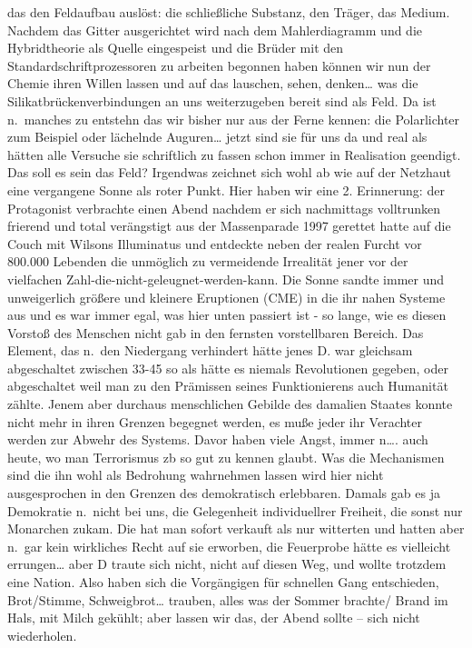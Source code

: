 \documentclass[
]{article}
\begin{document}
das den Feldaufbau auslöst: die schließliche Substanz, den Träger, das
Medium. Nachdem das Gitter ausgerichtet wird nach dem Mahlerdiagramm und
die Hybridtheorie als Quelle eingespeist und die Brüder mit den
Standardschriftprozessoren zu arbeiten begonnen haben können wir nun der
Chemie ihren Willen lassen und auf das lauschen, sehen, denken\ldots{}
was die Silikatbrückenverbindungen an uns weiterzugeben bereit sind als
Feld. Da ist n.~manches zu entstehn das wir bisher nur aus der Ferne
kennen: die Polarlichter zum Beispiel oder lächelnde Auguren\ldots{}
jetzt sind sie für uns da und real als hätten alle Versuche sie
schriftlich zu fassen schon immer in Realisation geendigt. Das soll es
sein das Feld? Irgendwas zeichnet sich wohl ab wie auf der Netzhaut eine
vergangene Sonne als roter Punkt. Hier haben wir eine 2. Erinnerung: der
Protagonist verbrachte einen Abend nachdem er sich nachmittags
volltrunken frierend und total verängstigt aus der Massenparade 1997
gerettet hatte auf die Couch mit Wilsons Illuminatus und entdeckte neben
der realen Furcht vor 800.000 Lebenden die unmöglich zu vermeidende
Irrealität jener vor der vielfachen
Zahl-die-nicht-geleugnet-werden-kann. Die Sonne sandte immer und
unweigerlich größere und kleinere Eruptionen (CME) in die ihr nahen
Systeme aus und es war immer egal, was hier unten passiert ist - so
lange, wie es diesen Vorstoß des Menschen nicht gab in den fernsten
vorstellbaren Bereich. Das Element, das n.~den Niedergang verhindert
hätte jenes D. war gleichsam abgeschaltet zwischen 33-45 so als hätte es
niemals Revolutionen gegeben, oder abgeschaltet weil man zu den
Prämissen seines Funktionierens auch Humanität zählte. Jenem aber
durchaus menschlichen Gebilde des damalien Staates konnte nicht mehr in
ihren Grenzen begegnet werden, es muße jeder ihr Verachter werden zur
Abwehr des Systems. Davor haben viele Angst, immer n\ldots. auch heute,
wo man Terrorismus zb so gut zu kennen glaubt. Was die Mechanismen sind
die ihn wohl als Bedrohung wahrnehmen lassen wird hier nicht
ausgesprochen in den Grenzen des demokratisch erlebbaren. Damals gab es
ja Demokratie n.~nicht bei uns, die Gelegenheit individuellrer Freiheit,
die sonst nur Monarchen zukam. Die hat man sofort verkauft als nur
witterten und hatten aber n.~gar kein wirkliches Recht auf sie erworben,
die Feuerprobe hätte es vielleicht errungen\ldots{} aber D traute sich
nicht, nicht auf diesen Weg, und wollte trotzdem eine Nation. Also haben
sich die Vorgängigen für schnellen Gang entschieden, Brot/Stimme,
Schweigbrot\ldots{} trauben, alles was der Sommer brachte/ Brand im
Hals, mit Milch gekühlt; aber lassen wir das, der Abend sollte -- sich
nicht wiederholen.
\end{document}
